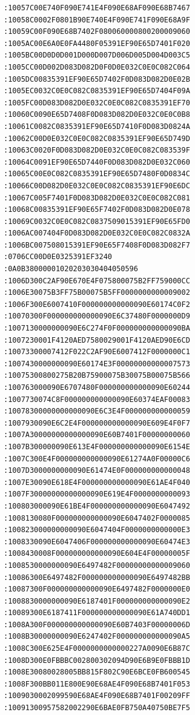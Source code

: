 \documentclass[a4paper,10pt]{article}
\begin{document}
\begin{lstlisting}
:10057C00E740F090E741E4F090E68AF090E68B7467
:10058C0002F0801B90E740E4F090E741F090E68A9F
:10059C00F090E68B7402F080060000800200009060
:1005AC00E6A0E0FA4480F05391EF90E65D7401F020
:1005BC00D0D0D001D000D007D006D005D004D003C5
:1005CC00D002D083D082D0F0D0E032C0E0C082C064
:1005DC00835391EF90E65D7402F0D083D082D0E02B
:1005EC0032C0E0C082C0835391EF90E65D7404F09A
:1005FC00D083D082D0E032C0E0C082C0835391EF70
:10060C0090E65D7408F0D083D082D0E032C0E0C0B8
:10061C0082C0835391EF90E65D7410F0D083D0824A
:10062C00D0E032C0E0C082C0835391EF90E65D749D
:10063C0020F0D083D082D0E032C0E0C082C083539F
:10064C0091EF90E65D7440F0D083D082D0E032C060
:10065C00E0C082C0835391EF90E65D7480F0D0834C
:10066C00D082D0E032C0E0C082C0835391EF90E6DC
:10067C005F7401F0D083D082D0E032C0E0C082C081
:10068C00835391EF90E65F7402F0D083D082D0E078
:10069C0032C0E0C082C0837509015391EF90E65FD0
:1006AC007404F0D083D082D0E032C0E0C082C0832A
:1006BC007508015391EF90E65F7408F0D083D082F7
:0706CC00D0E0325391EF3240
:0A0B38000001020203030404050596
:1006D300C2AF90E670E4F075800075B2FF759000CC
:1006E30075B3FF75B00075B5FF0000000000009002
:1006F300E6007410F000000000000090E60174C0F2
:10070300F000000000000090E6C37480F0000000D9
:1007130000000090E6C274F0F000000000000090BA
:1007230001F4120AED7580029001F4120AED90E6CD
:10073300007412F022C2AF90E6007412F0000000C1
:1007430000000090E60174E3F00000000000007573
:10075300800275B20B75900075B30075B00075B566
:100763000090E6707480F000000000000090E60244
:1007730074C8F000000000000090E60374EAF00083
:10078300000000000090E6C3E4F000000000000059
:1007930090E6C2E4F000000000000090E609E4F0F7
:1007A30000000000000090E60B7401F00000000060
:1007B300000090E613E4F000000000000090E6154E
:1007C300E4F000000000000090E61274A0F00000C6
:1007D3000000000090E61474E0F000000000000048
:1007E30090E618E4F000000000000090E61AE4F040
:1007F30000000000000090E619E4F0000000000093
:100803000090E61BE4F000000000000090E6047492
:1008130080F000000000000090E6047402F0000085
:100823000000000090E6047404F0000000000000E3
:1008330090E6047406F000000000000090E60474E3
:1008430008F000000000000090E604E4F00000005F
:1008530000000090E6497482F00000000000009060
:10086300E6497482F000000000000090E6497482BB
:10087300F000000000000090E6497482F0000000E0
:1008830000000090E6187401F000000000000090E2
:10089300E6187411F000000000000090E61A740DD1
:1008A300F000000000000090E60B7403F00000006D
:1008B30000000090E6247402F000000000000090A5
:1008C300E625E4F0000000000000227A0090E6B87C
:1008D300E0FBBBC002800302094D90E6B9E0FBBB1D
:1008E30080028005BB815F802C90E6BCE0FB600545
:1008F300BB011E800E90E68AE4F090E68B7401F053
:1009030002099590E68AE4F090E68B7401F00209FF
:10091300957582002290E6BAE0FB750A40750BE7F5

\end{lstlisting}
\end{document}
